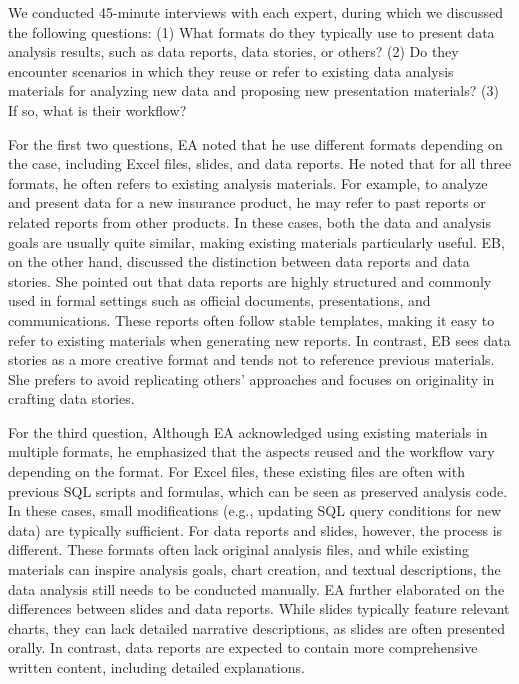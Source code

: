 We conducted 45-minute interviews with each expert, during which we discussed the following questions: (1) What formats do they typically use to present data analysis results, such as data reports, data stories, or others? (2) Do they encounter scenarios in which they reuse or refer to existing data analysis materials for analyzing new data and proposing new presentation materials? (3) If so, what is their workflow?

For the first two questions, EA noted that he use different formats depending on the case, including Excel files, slides, and data reports. 
He noted that for all three formats, he often refers to existing analysis materials. 
For example, to analyze and present data for a new insurance product,  he may refer to past reports or related reports from other products. 
In these cases, both the data and analysis goals are usually quite similar, making existing materials particularly useful.
EB, on the other hand, discussed the distinction between data reports and data stories. 
She pointed out that data reports are highly structured and commonly used in formal settings such as official documents, presentations, and communications. 
These reports often follow stable templates, making it easy to refer to existing materials when generating new reports. 
In contrast, EB sees data stories as a more creative format and tends not to reference previous materials. 
She prefers to avoid replicating others' approaches and focuses on originality in crafting data stories.

For the third question, Although EA acknowledged using existing materials in multiple formats, he emphasized that the aspects reused and the workflow vary depending on the format. 
For Excel files, these existing files are often with previous SQL scripts and formulas, which can be seen as preserved analysis code. 
In these cases, small modifications (e.g., updating SQL query conditions for new data) are typically sufficient. 
For data reports and slides, however, the process is different. 
These formats often lack original analysis files, and while existing materials can inspire analysis goals, chart creation, and textual descriptions, the data analysis still needs to be conducted manually.
EA further elaborated on the differences between slides and data reports. 
While slides typically feature relevant charts, they can lack detailed narrative descriptions, as slides are often presented orally. 
In contrast, data reports are expected to contain more comprehensive written content, including detailed explanations.


